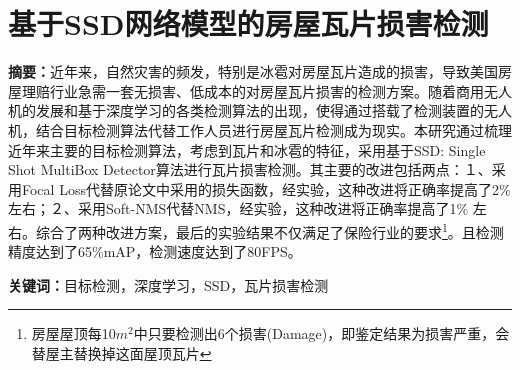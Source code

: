 \section*{基于SSD网络模型的房屋瓦片损害检测}
\par \noindent
\textbf{\songti {}摘要：}近年来，自然灾害的频发，特别是冰雹对房屋瓦片造成的损害，导致美国房屋理赔行业急需一套无损害、低成本的对房屋瓦片损害的检测方案。随着商用无人机的发展和基于深度学习的各类检测算法的出现，使得通过搭载了检测装置的无人机，结合目标检测算法代替工作人员进行房屋瓦片检测成为现实。本研究通过梳理近年来主要的目标检测算法，考虑到瓦片和冰雹的特征，采用基于SSD: Single Shot MultiBox Detector算法进行瓦片损害检测。其主要的改进包括两点：１、采用Focal Loss代替原论文中采用的损失函数，经实验，这种改进将正确率提高了2\% 左右；２、采用Soft-NMS代替NMS，经实验，这种改进将正确率提高了1\% 左右。综合了两种改进方案，最后的实验结果不仅满足了保险行业的要求\footnote{房屋屋顶每10$m^2$中只要检测出6个损害(Damage)，即鉴定结果为损害严重，会替屋主替换掉这面屋顶瓦片}。且检测精度达到了65\%mAP，检测速度达到了80FPS。~\\

\par \noindent
\textbf{\songti {}关键词：}{\kaishu {}目标检测，深度学习，SSD，瓦片损害检测}

